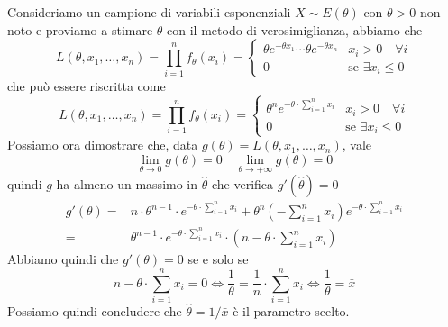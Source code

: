 \begin{example}
	Consideriamo un campione di variabili esponenziali $X \sim E(\theta)$ con $\theta > 0$ non noto
	e proviamo a stimare $\theta$ con il metodo di verosimiglianza, abbiamo che
	\[
		L(\theta, x_1, \dots, x_n) = \prod_{i=1}^n f_\theta(x_i) =
		\begin{cases}
			\theta e^{-\theta x_1} \cdots \theta e^{-\theta x_n} & x_i > 0 \quad \forall i       \\
			0                                                    & \text{se } \exists x_i \leq 0
		\end{cases}
	\]
	che può essere riscritta come
	\[
		L(\theta, x_1, \dots, x_n) =
		\prod_{i=1}^n f_\theta(x_i) =
		\begin{cases}
			\theta^n e^{-\theta \cdot \sum_{i=1}^{n} x_i} & x_i > 0 \quad \forall i       \\
			0                                             & \text{se } \exists x_i \leq 0
		\end{cases}
	\]
	Possiamo ora dimostrare che, data $g(\theta) = L(\theta, x_1, \dots, x_n)$, vale
	\[ \lim_{\theta \to 0} g(\theta) = 0 \quad \lim_{\theta \to +\infty} g(\theta) = 0 \]
	quindi $g$ ha almeno un massimo in $\hat{\theta}$ che verifica $g'(\hat{\theta}) = 0$
	\begin{align*}
		g'(\theta) = & n \cdot \theta^{n-1} \cdot e^{-\theta \cdot \sum_{i=1}^n x_i} +
		\theta^n \left( -\sum_{i=1}^{n} x_i \right) e^{-\theta \cdot \sum_{i=1}^{n} x_i} \\
		=            & \theta^{n-1} \cdot e^{-\theta \cdot \sum_{i=1}^{n} x_i} \cdot
		\left(n - \theta \cdot \sum_{i=1}^{n} x_i \right)
	\end{align*}
	Abbiamo quindi che $g'(\theta) = 0$ se e solo se
	\[
		n - \theta \cdot \sum_{i=1}^{n} x_i = 0 \iff
		\frac{1}{\theta} = \frac{1}{n} \cdot \sum_{i=1}^{n} x_i \iff
		\frac{1}{\theta} = \bar{x}
	\]
	Possiamo quindi concludere che $\hat{\theta} = 1 / \bar{x}$ è il parametro scelto.
\end{example}

